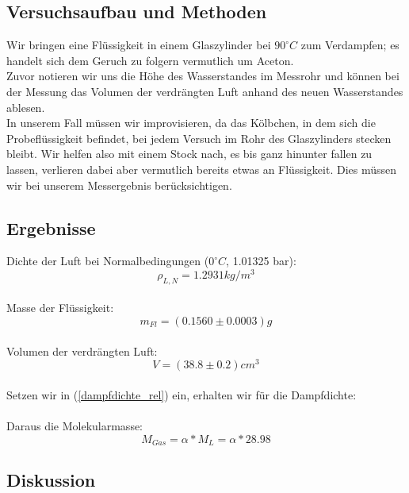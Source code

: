 \documentclass{article}
\begin{document}
\subsection{Versuchsaufbau und Methoden}
Wir bringen eine Flüssigkeit in einem Glaszylinder bei $90^\circ C$ zum Verdampfen; es handelt sich dem Geruch zu folgern vermutlich um Aceton. \\
Zuvor notieren wir uns die Höhe des Wasserstandes im Messrohr und können bei der Messung das Volumen der verdrängten Luft anhand des neuen Wasserstandes ablesen.\\
In unserem Fall müssen wir  improvisieren, da das Kölbchen, in dem sich die Probeflüssigkeit befindet, bei jedem Versuch im Rohr des Glaszylinders stecken bleibt. Wir helfen also mit einem Stock nach, es bis ganz hinunter fallen zu lassen, verlieren dabei aber vermutlich bereits etwas an Flüssigkeit. Dies müssen wir bei unserem Messergebnis berücksichtigen.
\subsection{Ergebnisse}
Dichte der Luft bei Normalbedingungen ($0^\circ C$, 1.01325 bar):
$$\rho_{L,N}=1.2931kg/m^3$$
\\
Masse der Flüssigkeit:
$$m_{Fl}=(0.1560 \pm 0.0003)g$$
\\
Volumen der verdrängten Luft:
$$V=(38.8 \pm 0.2)cm^3$$
\\
Setzen wir in (\ref{dampfdichte_rel}) ein, erhalten wir für die Dampfdichte:\\
\\
Daraus die Molekularmasse:\\
$$M_{Gas}=\alpha*M_L=\alpha*28.98$$
\subsection{Diskussion}
\end{document}
